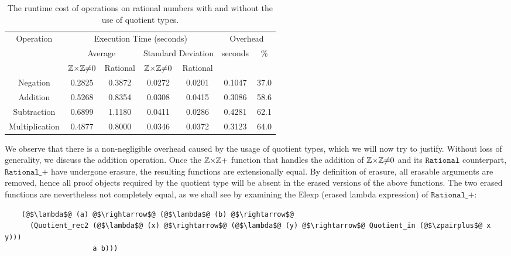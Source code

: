 \documentclass[12pt,twoside,maitrise]{dms}
\theoremstyle{definition}
\numberwithin{equation}{section}
\numberwithin{table}{chapter}
\numberwithin{figure}{chapter}
\newcommand\fn[1] {\texttt{#1}}
\begin{document}
\begin{table}[]
\centering
\begin{tabular}{@{}ccccccc@{}}
\toprule
\multirow{3}{*}{Operation} & \multicolumn{4}{c}{Execution Time (seconds)}                         & \multicolumn{2}{c}{Overhead}                   \\ \cmidrule(l){2-7}
                           & \multicolumn{2}{c}{Average} & \multicolumn{2}{c}{Standard Deviation} & \multirow{2}{*}{seconds} & \multirow{2}{*}{\%} \\
               & $\mathbb{Z}{\times}\mathbb{Z}{\ne}0$ & Rational & $\mathbb{Z}{\times}\mathbb{Z}{\ne}0$ & Rational &        &      \\ \midrule
Negation       & 0.2825   & 0.3872   & 0.0272   & 0.0201   & 0.1047 & 37.0 \\
Addition       & 0.5268   & 0.8354   & 0.0308   & 0.0415   & 0.3086 & 58.6 \\
Subtraction    & 0.6899   & 1.1180   & 0.0411   & 0.0286   & 0.4281 & 62.1 \\
Multiplication & 0.4877   & 0.8000   & 0.0346   & 0.0372   & 0.3123 & 64.0 \\ \bottomrule
\end{tabular}
\caption{The runtime cost of operations on rational numbers with and without the
  use of quotient types.}\label{tab:rational-benchmark}
\end{table}

We observe that there is a non-negligible overhead caused by the usage of
quotient types, which we will now try to justify. Without loss of generality, we
discuss the addition operation. Once the $\mathbb{Z}{\times}\mathbb{Z}+$ function that handles the
addition of $\mathbb{Z}{\times}\mathbb{Z}{\ne}0$ and its $\fn{Rational}$ counterpart, $\fn{Rational\_+}$
have undergone erasure, the resulting functions are extensionally equal. By
definition of erasure\cite{monnier2019typer}, all erasable arguments are
removed, hence all proof objects required by the quotient type will be absent in
the erased versions of the above functions. The two erased functions are
nevertheless not completely equal, as we shall see by examining the Elexp
(erased lambda expression)\cite{delaunay2017implementation} of
$\fn{Rational\_+}$:

\begin{verbatim}
    (@$\lambda$@ (a) @$\rightarrow$@ (@$\lambda$@ (b) @$\rightarrow$@
      (Quotient_rec2 (@$\lambda$@ (x) @$\rightarrow$@ (@$\lambda$@ (y) @$\rightarrow$@ Quotient_in (@$\zpairplus$@ x y)))
                     a b)))
\end{verbatim}
\end{document}
